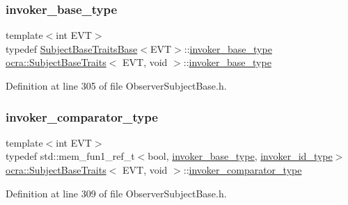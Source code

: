 \subsubsection{\texorpdfstring{invoker\+\_\+base\+\_\+type}{invoker\_base\_type}}
{\footnotesize\ttfamily template$<$int E\+VT$>$ \\
typedef \hyperlink{structocra_1_1SubjectBaseTraitsBase}{Subject\+Base\+Traits\+Base}$<$E\+VT$>$\+::\hyperlink{structocra_1_1SubjectBaseTraitsBase_a439671662c8f8f3e80e6675f008dec3f}{invoker\+\_\+base\+\_\+type} \hyperlink{structocra_1_1SubjectBaseTraits}{ocra\+::\+Subject\+Base\+Traits}$<$ E\+VT, void $>$\+::\hyperlink{structocra_1_1SubjectBaseTraitsBase_a439671662c8f8f3e80e6675f008dec3f}{invoker\+\_\+base\+\_\+type}}



Definition at line 305 of file Observer\+Subject\+Base.\+h.

\hypertarget{structocra_1_1SubjectBaseTraits_3_01EVT_00_01void_01_4_a1103b087174cb0f6e007f554c214c4d4}{}\label{structocra_1_1SubjectBaseTraits_3_01EVT_00_01void_01_4_a1103b087174cb0f6e007f554c214c4d4} 
\subsubsection{\texorpdfstring{invoker\+\_\+comparator\+\_\+type}{invoker\_comparator\_type}}
{\footnotesize\ttfamily template$<$int E\+VT$>$ \\
typedef std\+::mem\+\_\+fun1\+\_\+ref\+\_\+t$<$bool, \hyperlink{structocra_1_1SubjectBaseTraitsBase_a439671662c8f8f3e80e6675f008dec3f}{invoker\+\_\+base\+\_\+type}, \hyperlink{structocra_1_1SubjectBaseTraits_3_01EVT_00_01void_01_4_a35ce9f06a9f2a9e766ad2fb892283d08}{invoker\+\_\+id\+\_\+type}$>$ \hyperlink{structocra_1_1SubjectBaseTraits}{ocra\+::\+Subject\+Base\+Traits}$<$ E\+VT, void $>$\+::\hyperlink{structocra_1_1SubjectBaseTraits_3_01EVT_00_01void_01_4_a1103b087174cb0f6e007f554c214c4d4}{invoker\+\_\+comparator\+\_\+type}}



Definition at line 309 of file Observer\+Subject\+Base.\+h.

\hypertarget{structocra_1_1SubjectBaseTraits_3_01EVT_00_01void_01_4_a35ce9f06a9f2a9e766ad2fb892283d08}{}\label{structocra_1_1SubjectBaseTraits_3_01EVT_00_01void_01_4_a35ce9f06a9f2a9e766ad2fb892283d08} 
